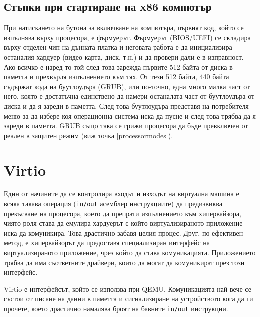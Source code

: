   \subsection{Стъпки при стартиране на x86 компютър}
  При натискането на бутона за включване на компютъра, първият код, който се изпълнява върху процесора, е фърмуерът. Фърмуерът (BIOS/UEFI) се складира върху отделен чип на дънната платка и неговата работа е да инициализира останалия хардуер (видео карта, диск, т.н.) и да провери дали е в изправност. Ако всичко е наред то той след това зарежда първите 512 байта от диска в паметта и прехвърля изпълнението към тях. От тези 512 байта, 440 байта съдържат кода на буутлоудъра (GRUB), или по-точно, една много малка част от него, която е достатъчна единствено да намери останалата част от буутлоудъра от диска и да я зареди в паметта. След това буутлоудъра представя на потребителя меню за да избере коя операционна система иска да пусне и след това трябва да я зареди в паметта. GRUB също така се грижи процесора да бъде превключен от реален в защитен режим (виж точка \ref{processormodes}).

\section{Virtio}

Един от начините да се контролира входът и изходът на виртуална машина е всяка такава операция ({\tt in/out} асемблер инструкциите) да предизвиква прекъсване на процесора, което да препрати изпълнението към хипервайзора, чиято роля става да емулира хардуерът с който виртуализираното приложение иска да комуникира. Това драстично забавя целия процес. Друг, по-ефективен метод, е хипервайзорът да предоставя специализиран интерфейс на виртуализираното приложение, чрез който да става комуникацията. Приложението трябва да има съответните драйвери, които да могат да комуникират през този интерфейс.

Virtio е интерфейсът, който се използва при QEMU. Комуникацията най-вече се състои от писане на данни в паметта и сигнализиране на устройството кога да ги прочете, което драстично намалява броят на бавните {\tt in/out} инструкции.

